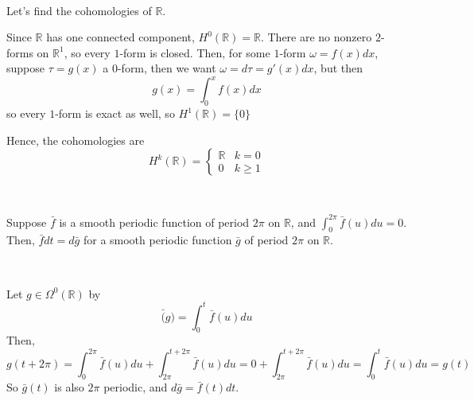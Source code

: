 \documentclass{article}
\begin{document}
\begin{example}[$\mathbb{R}$]
  \

  Let's find the cohomologies of $\mathbb{R}$.

  Since $\mathbb{R}$ has one connected component, $H^0(\mathbb{R}) = \mathbb{R}$. There are no nonzero $2$-forms on $\mathbb{R}^1$, so every $1$-form is closed. Then, for some $1$-form $\omega = f(x) dx$, suppose $\tau = g(x)$ a $0$-form, then we want $\omega = d\tau = g'(x) dx$, but then $$g(x) = \int_0^x f(x) dx$$so every $1$-form is exact as well, so $H^1(\mathbb{R}) = \{0\}$

  Hence, the cohomologies are $$H^k(\mathbb{R}) =
  \begin{cases}
    \mathbb{R} & k = 0\\
    0 & k \geq 1
  \end{cases}$$
\end{example}

\begin{lemma}
  \

  Suppose $\bar{f}$ is a smooth periodic function of period $2\pi$ on $\mathbb{R}$, and $\int_0^{2\pi} \bar{f}(u) du = 0$. Then, $\bar{f} dt = d\bar{g}$ for a smooth periodic function $\bar{g}$ of period $2\pi$ on $\mathbb{R}$.
\end{lemma}

\begin{customproof}
  \

  Let $g \in \Omega^0(\mathbb{R})$ by $$\bar(g) = \int_0^t \bar{f}(u) du$$Then, $$g(t + 2\pi) = \int_0^{2\pi} \bar{f}(u) du + \int_{2\pi}^{t + 2\pi} \bar{f}(u) du = 0 + \int_{2\pi}^{t + 2\pi} \bar{f}(u) du = \int_0^t \bar{f}(u) du = g(t)$$So $\bar{g}(t)$ is also $2\pi$ periodic, and $d\bar{g} = \bar{f}(t) dt$.
\end{customproof}
\end{document}
